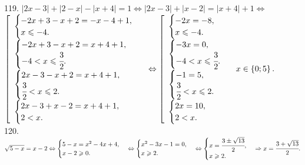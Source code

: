 \documentclass[12pt]{article}
\begin{document}
119. $|2x-3|+|2-x|-|x+4|=1\Leftrightarrow |2x-3|+|x-2|=|x+4|+1\Leftrightarrow$\\$ \left[\begin{array}{l}\begin{cases} -2x+3-x+2=-x-4+1,\\ x\leqslant-4.\end{cases}\\
\begin{cases} -2x+3-x+2=x+4+1,\\ -4<x\leqslant\cfrac{3}{2}.\end{cases}\\ \begin{cases} 2x-3-x+2=x+4+1,\\ \cfrac{3}{2}<x\leqslant2.\end{cases}\\
\begin{cases} 2x-3+x-2=x+4+1,\\ 2< x.\end{cases}\end{array}\right.\Leftrightarrow \left[\begin{array}{l}\begin{cases} -2x=-8,\\ x\leqslant-4.\end{cases}\\
\begin{cases} -3x=0,\\ -4<x\leqslant\cfrac{3}{2}.\end{cases}\\ \begin{cases} -1=5,\\ \cfrac{3}{2}<x\leqslant2.\end{cases}\\
\begin{cases} 2x=10,\\ 2< x.\end{cases}\end{array}\right.
x\in\left\{0;5\right\}.$\\
120. $\sqrt{5-x}=x-2\Leftrightarrow\begin{cases} 5-x=x^2-4x+4,\\ x-2\geqslant0.\end{cases}\Leftrightarrow\begin{cases} x^2-3x-1=0,\\ x\geqslant2.\end{cases}\Leftrightarrow\begin{cases} x=\cfrac{3\pm\sqrt{13}}{2},\\ x\geqslant2.\end{cases}\Rightarrow x=\cfrac{3+\sqrt{13}}{2}.$\\
\end{document}
